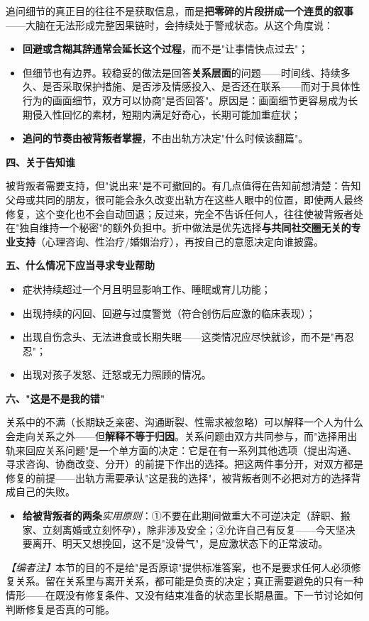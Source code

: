 追问细节的真正目的往往不是获取信息，而是\textbf{把零碎的片段拼成一个连贯的叙事}——大脑在无法形成完整因果链时，会持续处于警戒状态。从这个角度说：

\begin{itemize}
\item \textbf{回避或含糊其辞通常会延长这个过程}，而不是"让事情快点过去"；
\item 但细节也有边界。较稳妥的做法是回答\textbf{关系层面}的问题——时间线、持续多久、是否采取保护措施、是否涉及情感投入、是否还在联系——而对于具体性行为的画面细节，双方可以协商"是否回答"。原因是：画面细节更容易成为长期侵入性回忆的素材，短期内满足好奇心，长期可能加重症状；
\item \textbf{追问的节奏由被背叛者掌握}，不由出轨方决定"什么时候该翻篇"。
\end{itemize}

\textbf{四、关于告知谁}

被背叛者需要支持，但"说出来"是不可撤回的。有几点值得在告知前想清楚：告知父母或共同的朋友，很可能会永久改变出轨方在这些人眼中的位置，即使两人最终修复，这个变化也不会自动回退；反过来，完全不告诉任何人，往往使被背叛者处在"独自维持一个秘密"的额外负担中。折中做法是优先选择\textbf{与共同社交圈无关的专业支持}（心理咨询、性治疗/婚姻治疗），再按自己的意愿决定向谁披露。

\textbf{五、什么情况下应当寻求专业帮助}

\begin{itemize}
\item 症状持续超过一个月且明显影响工作、睡眠或育儿功能；
\item 出现持续的闪回、回避与过度警觉（符合创伤后应激的临床表现）；
\item 出现自伤念头、无法进食或长期失眠——这类情况应尽快就诊，而不是"再忍忍"；
\item 出现对孩子发怒、迁怒或无力照顾的情况。
\end{itemize}

\textbf{六、"这是不是我的错"}

关系中的不满（长期缺乏亲密、沟通断裂、性需求被忽略）可以解释一个人为什么会走向关系之外——但\textbf{解释不等于归因}。关系问题由双方共同参与，而"选择用出轨来回应关系问题"是一个单方面的决定：它是在有一系列其他选项（提出沟通、寻求咨询、协商改变、分开）的前提下作出的选择。把这两件事分开，对双方都是修复的前提——出轨方需要承认"这是我的选择"，被背叛者则不必把对方的选择背成自己的失败。

\begin{itemize}
\item \textbf{给被背叛者的两条}\emph{实用原则}：①不要在此期间做重大不可逆决定（辞职、搬家、立刻离婚或立刻怀孕），除非涉及安全；②允许自己有反复——今天坚决要离开、明天又想挽回，这不是"没骨气"，是应激状态下的正常波动。
\end{itemize}

\textit{【编者注】}本节的目的不是给"是否原谅"提供标准答案，也不是要求任何人必须修复关系。留在关系里与离开关系，都可能是负责的决定；真正需要避免的只有一种情形——在既没有修复条件、又没有结束准备的状态里长期悬置。下一节讨论如何判断修复是否真的可能。

